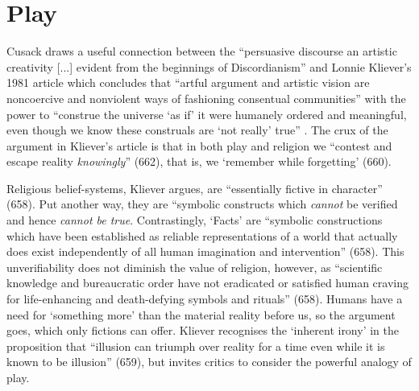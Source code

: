 \documentclass[Draft.tex]{subfiles}
\begin{document}
\section*{Play}
Cusack \parencite*[23]{Cusack10} draws a useful connection between the
``persuasive discourse an artistic creativity [...] evident
from the beginnings of Discordianism'' and
Lonnie Kliever's 1981 article which concludes that
``artful argument and artistic vision are noncoercive and nonviolent ways
of fashioning consentual communities'' with the power to
``construe the universe `as if' it were humanely ordered and meaningful,
even though we know these construals are
`not really' true'' \parencite[665]{Kliever81}.
The crux of the argument in Kliever's article is that
in both play and religion we 
``contest and escape reality \textit{knowingly}'' (662),
that is, we `remember while forgetting' (660).

Religious belief-systems, Kliever argues,
are ``essentially fictive in character'' (658).
Put another way, they are
``symbolic constructs which \textit{cannot} be verified
and hence \textit{cannot be true}.
Contrastingly, `Facts' are
``symbolic constructions which have been established as
reliable representations of a world that actually does exist
independently of all human imagination and intervention'' (658).
This unverifiability does not diminish the value of religion,
however, as ``scientific knowledge and bureaucratic order
have not eradicated or satisfied human craving
for life-enhancing and death-defying symbols and rituals'' (658).
Humans have a need for `something more' than
the material reality before us, so the argument goes,
which only fictions can offer.
Kliever recognises the `inherent irony' in the proposition that
``illusion can triumph over reality for a time
even while it is known to be illusion'' (659),
but invites critics to consider the powerful analogy of play.
\end{document}
